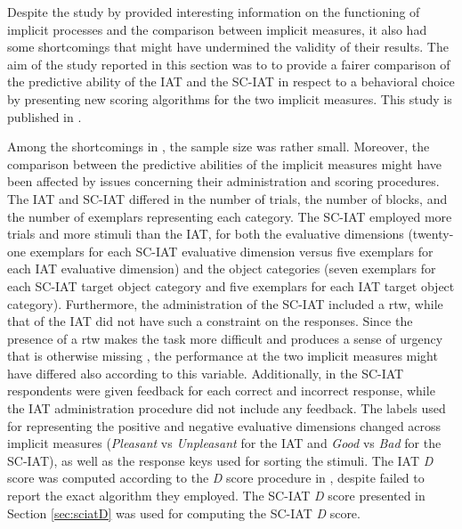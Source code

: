 \documentclass[12pt]{book}
\begin{document}
Despite the study by  provided interesting information on the functioning of implicit processes and the comparison between implicit measures, it also had some shortcomings that might have undermined the validity of their results. 
The aim of the study reported in this section was to to provide a fairer comparison of the predictive ability of the IAT and the SC-IAT in respect to a behavioral choice by presenting new  scoring algorithms for the two implicit measures. This study is published in .

Among the shortcomings in , the sample size was rather small. Moreover, the comparison between the predictive abilities of the implicit measures might have been affected by issues concerning their administration and scoring procedures. 
The IAT and SC-IAT differed in the number of trials, the number of blocks, and the number of exemplars representing each category. 
The SC-IAT employed more trials and more stimuli than the IAT, for both the evaluative dimensions (twenty-one exemplars for each SC-IAT evaluative dimension versus five exemplars for each IAT evaluative dimension) and the object categories (seven exemplars for each SC-IAT target object category and five exemplars for each IAT target object category). 
Furthermore, the administration of the SC-IAT included a rtw, while that of the IAT did not have such a constraint on the responses. Since the presence of a rtw makes the task more difficult and produces a sense of urgency that is otherwise missing \cite{karpinski2006}, the performance at the two implicit measures might have differed also according to this variable.
Additionally, in the SC-IAT respondents were given feedback for each correct and incorrect response, while the IAT administration procedure did not include any feedback. 
The labels used for representing the positive and negative evaluative dimensions changed across implicit measures (\emph{Pleasant} vs \emph{Unpleasant} for the IAT and \emph{Good} vs \emph{Bad} for the SC-IAT), as well as the response keys used for sorting the stimuli.  The IAT \emph{D} score was computed according to the \emph{D} score procedure in , despite  failed to report the exact algorithm they employed. The SC-IAT \emph{D} score presented in Section \ref{sec:sciatD} was used for computing the SC-IAT \emph{D} score.
\end{document}
